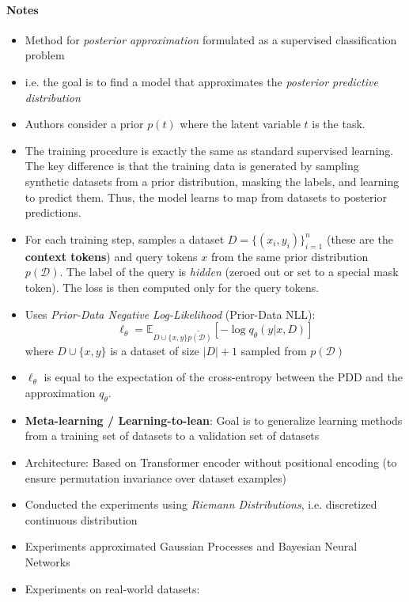 \documentclass[12pt,a4paper,twoside]{article}
\begin{document}
\begin{paper}
	\paragraph{Notes}
	\begin{itemize}
		\item Method for \textit{posterior approximation} formulated as a supervised classification problem
		\item[$\rightarrow$] i.e. the goal is to find a model that approximates the \textit{posterior predictive distribution} 
		\item[$\rightarrow$] Authors consider a prior $p(t)$ where the latent variable $t$ is the task. 
		\item The training procedure is exactly the same as standard supervised learning. The key difference is that the training data is generated by sampling synthetic datasets from a prior distribution, masking the labels, and learning to predict them. Thus, the model learns to map from datasets to posterior predictions.
		\item[$\rightarrow$] For each training step, samples a dataset $D = \{(x_i, y_i)\}^n_{i=1}$ (these are the \textbf{context tokens}) and query tokens $x$ from the same prior distribution $p(\mathcal{D})$. The label of the query is \textit{hidden} (zeroed out or set to a special mask token). The loss is then computed only for the query tokens.
		\item[$\rightarrow$] Uses \textit{Prior-Data Negative Log-Likelihood} (Prior-Data NLL): \[ \ell_\theta = \mathbb{E}_{D \cup \{ x, y\} \tilde{p(\mathcal{D})} }[- \log q_\theta (y | x, D)] \] where $D \cup \{ x, y\}$ is a dataset of size $|D| + 1 $ sampled from $p(\mathcal{D})$
		\item[$\rightarrow$] $\ell_\theta$ is equal to the expectation of the cross-entropy between the PDD and the approximation $q_\theta$. 
		\item \textbf{Meta-learning / Learning-to-lean}: Goal is to generalize learning methods from a training set of datasets to a validation set of datasets
		\item Architecture: Based on Transformer encoder without positional encoding (to ensure permutation invariance over dataset examples)
		\item Conducted the experiments using \textit{Riemann Distributions}, i.e. discretized continuous distribution
		\item Experiments approximated Gaussian Processes and Bayesian Neural Networks
		\item Experiments on real-world datasets:

\end{itemize}
\end{paper}
\end{document}
